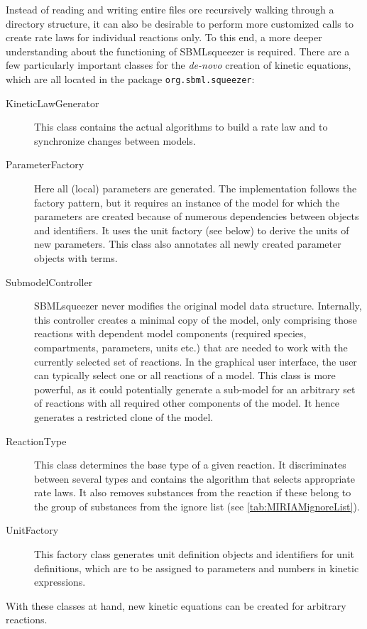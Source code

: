 Instead of reading and writing entire files ore recursively walking through a directory structure, it can also be desirable to perform more customized calls to create rate laws for individual reactions only.
To this end, a more deeper understanding about the functioning of SBMLsqueezer is required.
There are a few particularly important classes for the \emph{de-novo} creation of kinetic equations, which are all located in the package \texttt{org.sbml.squeezer}:
\begin{description}
  \item[KineticLawGenerator] This class contains the actual algorithms to build a rate law and to synchronize changes between models.
  \item[ParameterFactory]
    Here all (local) parameters are generated.
    The implementation follows the factory pattern, but it requires an instance of the model for which the parameters are created because of numerous dependencies between objects and identifiers.
    It uses the unit factory (see below) to derive the units of new parameters.
    This class also annotates all newly created parameter objects with \SBO terms.
  \item[SubmodelController]
    SBMLsqueezer never modifies the original model data structure.
    Internally, this controller creates a minimal copy of the model, only comprising those reactions with dependent model components (required species, compartments, parameters, units etc.) that are needed to work with the currently selected set of reactions.
    In the graphical user interface, the user can typically select one or all reactions of a model.
    This class is more powerful, as it could potentially generate a sub-model for an arbitrary set of reactions with all required other components of the model.
    It hence generates a restricted clone of the model.
  \item[ReactionType]
    This class determines the base type of a given reaction.
    It discriminates between several types and contains the algorithm that selects appropriate rate laws.
    It also removes substances from the reaction if these belong to the group of substances from the ignore list (see  \vref{tab:MIRIAMignoreList}).
  \item[UnitFactory]
    This factory class generates unit definition objects and identifiers for unit definitions, which are to be assigned to parameters and numbers in kinetic expressions.
\end{description}
\renewcommand{\descriptionlabel}[1]{\textcolor{black}{\textbf{#1}}}
With these classes at hand, new kinetic equations can be created for arbitrary reactions.


